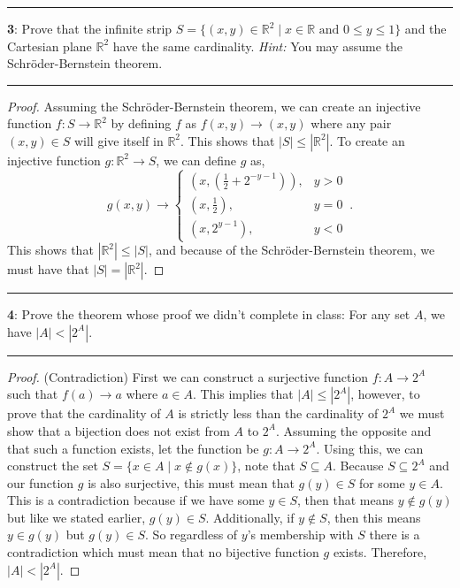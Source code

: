 \documentclass[11pt]{article}
\newcommand\question[2]{\vspace{.25in}\hrule\textbf{#1}: #2\vspace{.5em}\hrule\vspace{.10in}}
\newcommand{\R}{\mathbb{R}}
\begin{document}
\question{3}{Prove that the infinite strip $S = \{(x,y) \in \R^2 \mid x \in \R \text{ and } 0 \le y \le 1 \}$ and the Cartesian plane $\R^2$ have the same cardinality. \textit{Hint:} You may assume the Schröder-Bernstein theorem.}

\begin{proof}
	Assuming the Schröder-Bernstein theorem, we can create an injective function $f:S \rightarrow \R^2$ by defining $f$ as $f(x,y) \rightarrow (x,y)$ where any pair $(x,y) \in S$ will give itself in $\R^2$. This shows that $| S | \le | \R^2 |$. To create an injective function $g : \R^2 \rightarrow S$, we can define $g$ as,
	\begin{equation*}
		g(x,y) \rightarrow
		\begin{cases}
			\left(x,\left(\frac{1}{2} + 2^{-y-1}\right)\right) , & y > 0\\
			\left(x,\frac{1}{2}\right), & y = 0\\
			\left(x, 2^{y-1}\right), & y < 0
		\end{cases}\,.
	\end{equation*}
	This shows that $| \R^2 | \le | S |$, and because of the Schröder-Bernstein theorem, we must have that $| S | = | \R^2 |$.
\end{proof}

\question{4}{Prove the theorem whose proof we didn't complete in class: For any set $A$, we have $| A | < | 2^A |$.}

\begin{proof}
	(Contradiction) First we can construct a surjective function $f: A \rightarrow 2^A$ such that $f(a) \rightarrow a$ where $a \in A$. This implies that $|A| \le |2^A|$, however, to prove that the cardinality of $A$ is strictly less than the cardinality of $2^A$ we must show that a bijection does not exist from $A$ to $2^A$. Assuming the opposite and that such a function exists, let the function be $g : A \rightarrow 2^A$. Using this, we can construct the set $S=\{x \in A \mid x \not\in g(x)\}$, note that $S \subseteq A$. Because $S \subseteq 2^A$ and our function $g$ is also surjective, this must mean that $g(y) \in S$ for some $y \in A$. This is a contradiction because if we have some $y \in S$, then that means $y \not \in g(y)$ but like we stated earlier, $g(y) \in S$. Additionally, if $y \not \in S$, then this means $y \in g(y)$ but $g(y) \in S$. So regardless of $y$'s membership with $S$ there is a contradiction which must mean that no bijective function $g$ exists. Therefore, $|A| < |2^A|$.
\end{proof}

	
\end{document}
